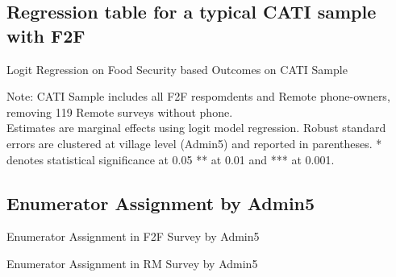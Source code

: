 \documentclass[11pt,harvard]{article}
\begin{document}
\pagebreak

\subsection{Regression table for a typical CATI sample with F2F}
\begin{table}[htbp]
	\centering
	\begin{adjustbox}{max width=\textwidth}
		\begin{threeparttable}
			\caption{Logit Regression on Food Security based Outcomes on CATI Sample}
			\scriptsize
			 
			\label{tab:CAR_FS_Logit_CATI}
			\begin{tablenotes}
				\item Note: CATI Sample includes all F2F respomdents and Remote phone-owners, removing 119 Remote surveys without phone. \\
				Estimates are marginal effects using logit model regression. Robust standard errors are clustered at village level (Admin5) and reported in parentheses. * denotes statistical significance at 0.05 ** at 0.01 and *** at 0.001. 
			\end{tablenotes}
		\end{threeparttable}
	\end{adjustbox}
\end{table}

\pagebreak

\subsection{Enumerator Assignment by Admin5}

	\begin{table}[htbp]
		\centering
		\begin{adjustbox}{max width=\textwidth,keepaspectratio}
			\begin{threeparttable}
				\caption{Enumerator Assignment in F2F Survey by Admin5}
				\scriptsize
				 
				\label{tab:CAR_Enum_Admin5_F2F_Complete}
			\end{threeparttable}
		\end{adjustbox}
	\end{table}
	
		\begin{table}[htbp]
		\centering
		\begin{adjustbox}{max width=\textwidth,keepaspectratio}
			\begin{threeparttable}
				\caption{Enumerator Assignment in RM Survey by Admin5}
				\scriptsize
				 
				\label{tab:CAR_Enum_Admin5_RM_Complete}
			\end{threeparttable}
		\end{adjustbox}
	\end{table}
\end{document}

